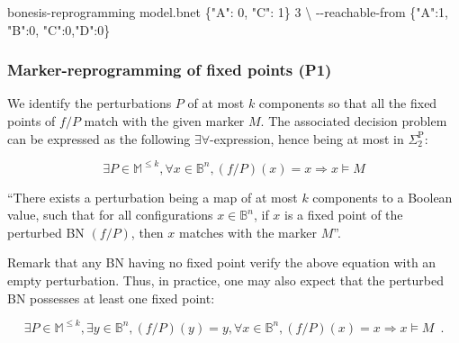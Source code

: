 \documentclass[PCJ,Unicode,screen,mode=plain]{cedram}
\newenvironment{Shaded}{}{}
\newcommand{\DataTypeTok}[1]{\textcolor[rgb]{0.56,0.13,0.00}{{#1}}}
\newcommand{\StringTok}[1]{\textcolor[rgb]{0.25,0.44,0.63}{{#1}}}
\newcommand{\NormalTok}[1]{{#1}}
\newcommand{\ExtensionTok}[1]{{#1}}
\newcommand{\AttributeTok}[1]{\textcolor[rgb]{0.49,0.56,0.16}{{#1}}}
\begin{document}
\begin{Shaded}
\begin{Highlighting}[]
\ExtensionTok{bonesis{-}reprogramming}\NormalTok{ model.bnet }\StringTok{\textquotesingle{}\{"A": 0, "C": 1\}\textquotesingle{}}\NormalTok{ 3 }\DataTypeTok{\textbackslash{}}
        \AttributeTok{{-}{-}reachable{-}from} \StringTok{\textquotesingle{}\{"A":1, "B":0, "C":0,"D":0\}\textquotesingle{}}
\end{Highlighting}
\end{Shaded}
\hypertarget{marker-reprogramming-of-fixed-points-p1}{%
\subsubsection{Marker-reprogramming of fixed points
(P1)}\label{marker-reprogramming-of-fixed-points-p1}}

We identify the perturbations \(P\) of at most \(k\) components so that
all the fixed points of \(f/P\) match with the given marker \(M\). The
associated decision problem can be expressed as the following
\(\exists\forall\)-expression, hence being at most in
\(\Sigma_2^{\mathrm P}\):

\begin{equation}
\exists P\in \mathbb M^{\leq k}, \forall x\in\mathbb B^n, (f/P)(x) = x \Rightarrow x\models M
\end{equation}

``There exists a perturbation being a map of at most \(k\) components to
a Boolean value, such that for all configurations \(x\in\mathbb B^n\),
if \(x\) is a fixed point of the perturbed BN \((f/P)\), then \(x\)
matches with the marker \(M\)''.

Remark that any BN having no fixed point verify the above equation with
an empty perturbation. Thus, in practice, one may also expect that the
perturbed BN possesses at least one fixed point:

\begin{equation}
\exists P\in \mathbb M^{\leq k}, \exists y\in\mathbb B^n, (f/P)(y) = y, \forall x\in\mathbb B^n, (f/P)(x) = x \Rightarrow x\models M\enspace.
\end{equation}
\end{document}
